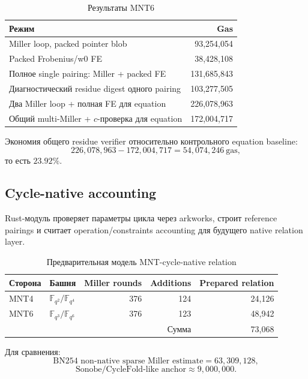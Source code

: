 \documentclass[12pt,a4paper]{article}
\newcommand{\Gas}{\mathrm{gas}}
\begin{document}
\begin{table}[htbp]
\centering
\caption{Результаты MNT6}
\small
\begin{tabularx}{\linewidth}{Y r}
\toprule
Режим & Gas \\
\midrule
Miller loop, packed pointer blob & 93,254,054 \\
Packed Frobenius/w0 FE & 38,428,108 \\
Полное single pairing: Miller + packed FE & 131,685,843 \\
Диагностический residue digest одного pairing & 103,277,505 \\
Два Miller loop + полная FE для equation & 226,078,963 \\
Общий multi-Miller + $c$-проверка для equation & 172,004,717 \\
\bottomrule
\end{tabularx}
\end{table}

Экономия общего residue verifier относительно контрольного equation baseline:
\[
    226{,}078{,}963-172{,}004{,}717
    =54{,}074{,}246\ \Gas,
\]
то есть $23.92\%$.

\subsection{Cycle-native accounting}

Rust-модуль проверяет параметры цикла через arkworks, строит reference
pairings и считает operation/constraints accounting для будущего native
relation layer.


\begin{table}[htbp]
\centering
\caption{Предварительная модель MNT-cycle-native relation}
\small
\begin{tabular}{l l r r r}
\toprule
Сторона & Башня & Miller rounds & Additions & Prepared relation \\
\midrule
MNT4 & $\mathbb{F}_{q^2}/\mathbb{F}_{q^4}$ & 376 & 124 & 24,126 \\
MNT6 & $\mathbb{F}_{q^3}/\mathbb{F}_{q^6}$ & 376 & 123 & 48,942 \\
\midrule
\multicolumn{4}{r}{Сумма} & 73,068 \\
\bottomrule
\end{tabular}
\end{table}

Для сравнения:
\[
    \text{BN254 non-native sparse Miller estimate}=63{,}309{,}128,
\]
\[
    \text{Sonobe/CycleFold-like anchor}\approx9{,}000{,}000.
\]
\end{document}

